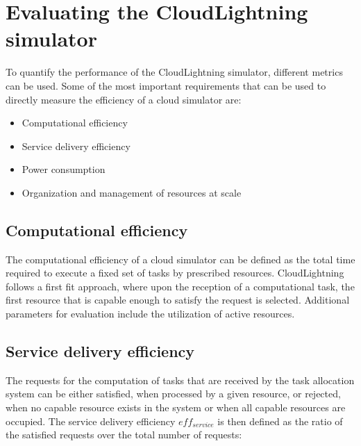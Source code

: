 \section{Evaluating the CloudLightning simulator}

To quantify the performance of the CloudLightning simulator, different metrics can be used. Some of the most important requirements that can be used to directly measure the efficiency of a cloud simulator are:

\begin{itemize}
\item Computational efficiency
\item Service delivery efficiency
\item Power consumption
\item Organization and management of resources at scale
\end{itemize}

\subsection{Computational efficiency}

The computational efficiency of a cloud simulator can be defined as the total time required to execute a fixed set of tasks by prescribed resources. CloudLightning follows a first fit approach, where upon the reception of a computational task, the first resource that is capable enough to satisfy the request is selected. Additional parameters for evaluation include the utilization of active resources.




\subsection{Service delivery efficiency}

The requests for the computation of tasks that are received by the task allocation system can be either satisfied, when processed by a given resource, or rejected, when no capable resource exists in the system or when all capable resources are occupied. The service delivery efficiency $eff_{service}$ is then defined as the ratio of the satisfied requests over the total number of requests:

